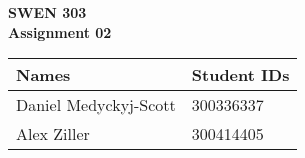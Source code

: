 \documentclass[a4paper,oneside,12pt]{article}
\begin{document}
\fontsize{80}{100}
\selectfont 
\noindent
{\bf SWEN 303\\
\fontsize{36}{50}
\selectfont 
Assignment 02\\
\begin{tabularx}{\textwidth}{X| l}
Names & Student IDs\\ \hline
Daniel Medyckyj-Scott & 300336337\\
Alex Ziller & 300414405
\end{tabularx}
}
\pagebreak

\fontsize{12}{14}
\selectfont


\end{document}
